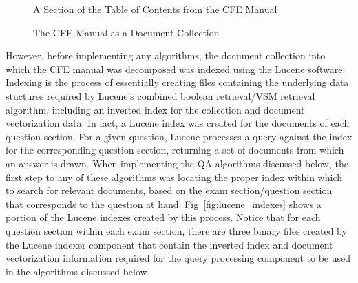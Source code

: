 \begin{figure}
\centering
\vspace{1.0in}
\caption{A Section of the Table of Contents from the CFE Manual}
\label{fig:cfe_manual_toc}
\end{figure}

\begin{figure}
\centering
\vspace{1.0in}
\caption{The CFE Manual as a Document Collection}
\label{fig:document_collection}
\end{figure}

However, before implementing any algorithms, the document collection into which the CFE manual was decomposed was indexed using the Lucene software.  Indexing is the process of essentially creating files containing the underlying data stuctures required by Lucene's combined boolean retrieval/VSM retrieval algorithm, including an inverted index for the collection and document vectorization data.  In fact, a Lucene index was created for the documents of each question section.   For a given question, Lucene processes a query against the index for the corresponding question section, returning a set of documents from which an answer is drawn.  When implementing the QA algorithms discussed below, the first step to any of these algorithms was locating the proper index within which to search for relevant documents, based on the exam section/question section that corresponds to the question at hand.  Fig~\ref{fig:lucene_indexes} shows a portion of the Lucene indexes created by this process.  Notice that for each question section within each exam section, there are three binary files created by the Lucene indexer component that contain the inverted index and document vectorization information required for the query processing component to be used in the algorithms discussed below.

